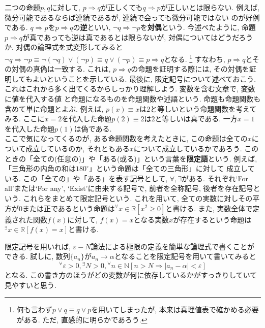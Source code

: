        二つの命題$p,q$に対して, $p\Rightarrow q$が正しくても$q\Rightarrow p$が正しいとは限らない. 例えば, 微分可能であるならば連続であるが, 連続で会っても微分可能ではない
        のが好例である.  $q\Rightarrow p$を$p\Rightarrow q$の\textbf{逆}といい, $\lnot q\Rightarrow \lnot p$を\textbf{対偶}という.
        今述べたように, 命題$p\Rightarrow q$が真であっても逆は真であるとは限らないが, 対偶についてはどうだろうか. 対偶の論理式を式変形してみると
        $\lnot q\Rightarrow \lnot p\equiv \lnot (\lnot q) \lor (\lnot p) \equiv q \lor (\lnot p)\equiv p \Rightarrow q$となる. \footnote{何も言わず$p\lor q \equiv q \lor p$を用いてしまったが, 本来は真理値表で確かめる必要がある. ただ, 直感的に明らかであろう.}
        すなわち, $p \Rightarrow q$とその対偶の真偽は一致する. これは, $p \Rightarrow q$の命題を証明する際には, その対偶を証明してもよいということを示している.
        \clearpage
        最後に, 限定記号について述べておこう. これはこれから多く出てくるからしっかり理解しよう. 変数を含む文章で, 変数に値を代入する値
        と命題になるものを命題関数や述語という. 命題も命題関数も含めて単に命題とよぶ. 例えば, $p(x)\equiv\text{$x$は2と等しい}$という命題関数を考えてみる. ここに$x=2$を代入した命題$p(2)\equiv\text{$2$は2と等しい}$は真である.
        一方$x=1$を代入した命題$p(1)$は偽である.\\

        ここで気になってくるのが, ある命題関数を考えたときに, この命題は全ての$x$について成立しているのか, それともある$x$について成立しているかであろう. 
        このときの「全ての(任意の)」や「ある(或る)」という言葉を\textbf{限定語}という. 例えば, 「三角形の内角の和は$180^\circ$」という命題は「全ての三角形」に対して
        成立している. この「全ての」や「ある」を表す記号として, $\forall,\exists$がある. それぞれ`For all'または`For any', `Exist'に由来する記号で, 
        前者を全称記号, 後者を存在記号という. これらをまとめて限定記号という. これを用いて, 全ての実数に対しその平方が0または正であるという命題は$^\forall x\in \mathbb{R} [x^2\geq 0]$と書ける.
        また, 実数全体で定義された関数$f(x)$に対して, $f(x)=x$となる実数$x$が存在するという命題は$^\exists x\in \mathbb{R}[f(x)=x]$と書ける.

        限定記号を用いれば, $\varepsilon-N$論法による極限の定義を簡単な論理式で書くことができる. 試しに, 数列$\{a_n\}$が$a_n\rightarrow \alpha$となることを限定記号を用いて書いてみると
        \begin{equation*}
            {}^\forall \varepsilon>0, {}^\exists N>0, {}^\forall n\in \mathbb{N} \left[n>N \Rightarrow |a_n-\alpha|<\varepsilon\right]
        \end{equation*}
        となる. この書き方のほうがどの変数が何に依存しているかがすっきりしていて見やすいと思う.\\

